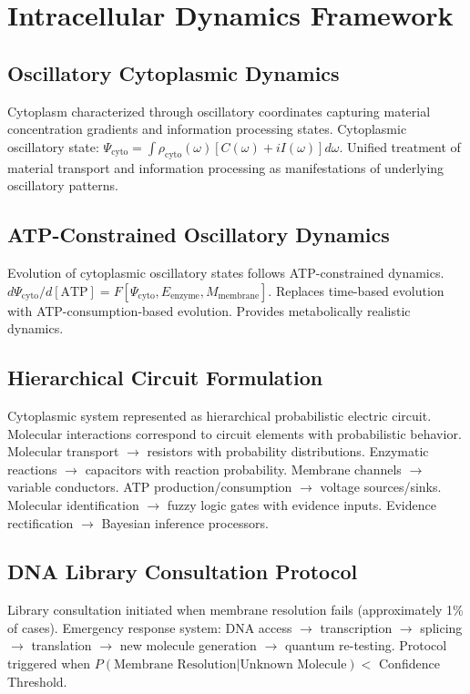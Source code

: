 \documentclass[12pt,a4paper]{article}
\begin{document}
\section{Intracellular Dynamics Framework}

\subsection{Oscillatory Cytoplasmic Dynamics}

Cytoplasm characterized through oscillatory coordinates capturing material concentration gradients and information processing states. Cytoplasmic oscillatory state: $\Psi_{\text{cyto}} = \int \rho_{\text{cyto}}(\omega) [C(\omega) + iI(\omega)] d\omega$. Unified treatment of material transport and information processing as manifestations of underlying oscillatory patterns.

\subsection{ATP-Constrained Oscillatory Dynamics}

Evolution of cytoplasmic oscillatory states follows ATP-constrained dynamics. $d\Psi_{\text{cyto}}/d[\text{ATP}] = F[\Psi_{\text{cyto}}, E_{\text{enzyme}}, M_{\text{membrane}}]$. Replaces time-based evolution with ATP-consumption-based evolution. Provides metabolically realistic dynamics.

\subsection{Hierarchical Circuit Formulation}

Cytoplasmic system represented as hierarchical probabilistic electric circuit. Molecular interactions correspond to circuit elements with probabilistic behavior. Molecular transport $\to$ resistors with probability distributions. Enzymatic reactions $\to$ capacitors with reaction probability. Membrane channels $\to$ variable conductors. ATP production/consumption $\to$ voltage sources/sinks. Molecular identification $\to$ fuzzy logic gates with evidence inputs. Evidence rectification $\to$ Bayesian inference processors.

\subsection{DNA Library Consultation Protocol}

Library consultation initiated when membrane resolution fails (approximately 1\% of cases). Emergency response system: DNA access $\to$ transcription $\to$ splicing $\to$ translation $\to$ new molecule generation $\to$ quantum re-testing. Protocol triggered when $P(\text{Membrane Resolution}|\text{Unknown Molecule}) <$ Confidence Threshold.
\end{document}
